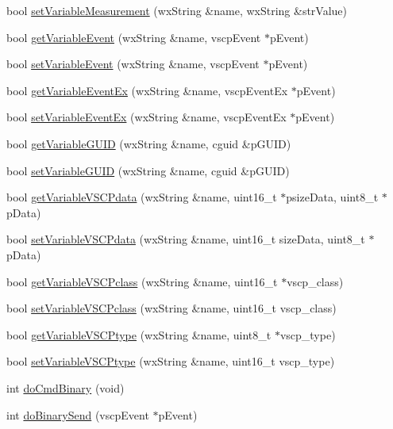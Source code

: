 \begin{DoxyCompactItemize}
\item 
bool \hyperlink{class_vscp_tcp_if_a0341db7880611ddc8c4194fa3460fbb9}{setVariableMeasurement} (wxString \&name, wxString \&strValue)
\item 
bool \hyperlink{class_vscp_tcp_if_a0dc4e23ff4782e9e6ae152119c6baf24}{getVariableEvent} (wxString \&name, vscpEvent $\ast$pEvent)
\item 
bool \hyperlink{class_vscp_tcp_if_af534e277da408ae2bd482c6c2614ff3f}{setVariableEvent} (wxString \&name, vscpEvent $\ast$pEvent)
\item 
bool \hyperlink{class_vscp_tcp_if_ad8f799c4767da6c56009d14ac3dad75b}{getVariableEventEx} (wxString \&name, vscpEventEx $\ast$pEvent)
\item 
bool \hyperlink{class_vscp_tcp_if_a3010d9a88088f08ba69b8cdae8b1f108}{setVariableEventEx} (wxString \&name, vscpEventEx $\ast$pEvent)
\item 
bool \hyperlink{class_vscp_tcp_if_a3b6fc466178034a89dcd04db11bc23e2}{getVariableGUID} (wxString \&name, cguid \&pGUID)
\item 
bool \hyperlink{class_vscp_tcp_if_ab5364334b2cf72ab02866de4edaf7b54}{setVariableGUID} (wxString \&name, cguid \&pGUID)
\item 
bool \hyperlink{class_vscp_tcp_if_a3db06b705a2278bbb5d8cabe152e229d}{getVariableVSCPdata} (wxString \&name, uint16\_\-t $\ast$psizeData, uint8\_\-t $\ast$pData)
\item 
bool \hyperlink{class_vscp_tcp_if_a08fa8b964c1cac1f766a2071ea139086}{setVariableVSCPdata} (wxString \&name, uint16\_\-t sizeData, uint8\_\-t $\ast$pData)
\item 
bool \hyperlink{class_vscp_tcp_if_a369353e14f8cc21834d72353e083a992}{getVariableVSCPclass} (wxString \&name, uint16\_\-t $\ast$vscp\_\-class)
\item 
bool \hyperlink{class_vscp_tcp_if_a23c9289d5a9f579e5954d53bd788ae63}{setVariableVSCPclass} (wxString \&name, uint16\_\-t vscp\_\-class)
\item 
bool \hyperlink{class_vscp_tcp_if_aec99ac2810aa51e17e7ab3d345b48957}{getVariableVSCPtype} (wxString \&name, uint8\_\-t $\ast$vscp\_\-type)
\item 
bool \hyperlink{class_vscp_tcp_if_a863482f724c6e866c5866eba3feb2878}{setVariableVSCPtype} (wxString \&name, uint16\_\-t vscp\_\-type)
\item 
int \hyperlink{class_vscp_tcp_if_a09bd4dd71f6153d8fe8deae8aedddfd6}{doCmdBinary} (void)
\item 
int \hyperlink{class_vscp_tcp_if_ab1180ecd0fe8d78795ded7b2686430e7}{doBinarySend} (vscpEvent $\ast$pEvent)

\end{DoxyCompactItemize}
